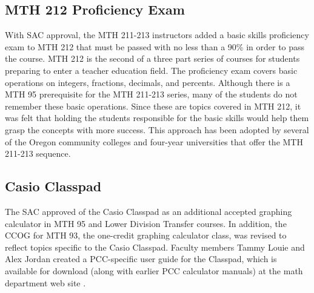 \subsection{MTH 212 Proficiency Exam}
With SAC approval, the MTH 211-213 instructors added a basic skills proficiency
exam to MTH 212 that must be passed with no less than a 90\% in order to pass
the course.  MTH 212 is the second of a three part series of courses for
students preparing to enter a teacher education field. The proficiency exam
covers basic operations on integers, fractions, decimals, and percents.
Although there is a MTH 95 prerequisite for the MTH 211-213 series, many of the
students do not remember these basic operations. Since these are topics covered
in MTH 212, it was felt that holding the students responsible for the basic
skills would help them grasp the concepts with more success.  This approach has
been adopted by several of the Oregon community colleges and four-year
universities that offer the MTH 211-213 sequence.

\subsection{Casio Classpad}
The SAC approved of the Casio Classpad as an additional accepted graphing
calculator in MTH 95 and Lower Division Transfer courses. In addition, the CCOG
for MTH 93, the one-credit graphing calculator class, was revised to reflect topics
specific to the Casio Classpad. Faculty members Tammy Louie and Alex Jordan
created a PCC-specific user guide for the Classpad, which is available for
download (along with earlier PCC calculator manuals) at the math department web
site \cite{pccmathdept}. 
